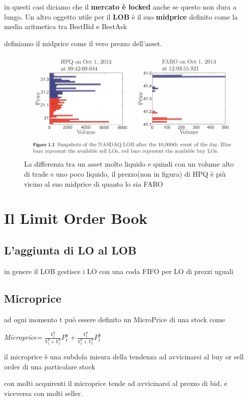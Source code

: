 \documentclass[a4paper,11pt]{report}
\begin{document}
{	in questi casi diciamo che il \textbf{mercato è locked} anche se questo non dura a lungo. \newline
	Un altro oggetto utile per il \textbf{LOB} è il suo \textbf{midprice} definito come la media aritmetica tra BestBid e BestAsk

	definiamo il midprice come il vero prezzo dell'asset.

\begin{figure}[h!]
\includegraphics[width=\linewidth]{LOB.png}
\caption {La differenza tra un asset molto liquido e quindi con un volume alto di trade e uno poco liquido, il prezzo(non in figura) di HPQ è più vicino al suo midprice di quanto lo sia FARO}
\end{figure}

\newpage


\section{Il Limit Order Book}
\subsection{L'aggiunta di LO al LOB}
	in genere il LOB gestisce i LO con una coda FIFO per LO di prezzi uguali
\subsection{Microprice}
	ad ogni momento t può essere definito un MicroPrice di una stock come
\begin{center}
	{\emph{Microprice= ${\frac {V_t^b}{V_t^b + V_t^a}}P_t^a + {\frac {V_t^a}{V_t^b+V_t^a}}P_t^b$}}
\end{center}
	il microprice è una subdola misura della tendenza ad avvicinarsi al buy or sell order di una particolare stock

	con molti acquirenti il microprice tende ad avvicinarsi al prezzo di bid, e viceversa con molti seller.
}
\end{document}
